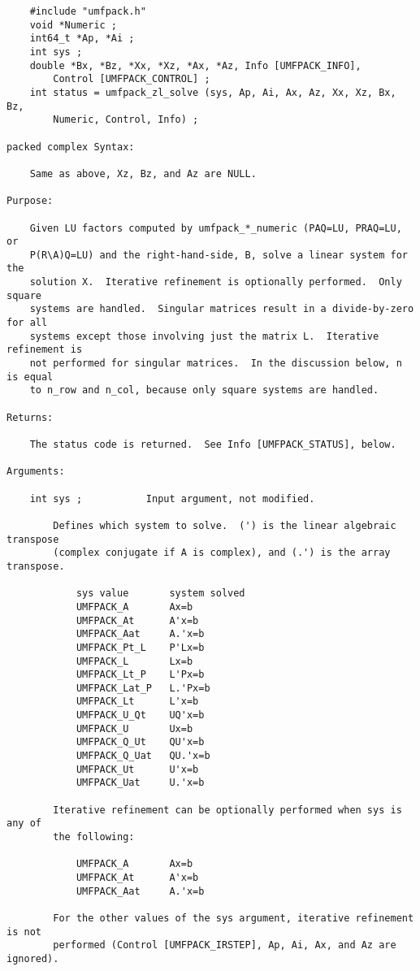 \documentclass[11pt]{article}
\begin{document}
{\begin{verbatim}
    #include "umfpack.h"
    void *Numeric ;
    int64_t *Ap, *Ai ;
    int sys ;
    double *Bx, *Bz, *Xx, *Xz, *Ax, *Az, Info [UMFPACK_INFO],
        Control [UMFPACK_CONTROL] ;
    int status = umfpack_zl_solve (sys, Ap, Ai, Ax, Az, Xx, Xz, Bx, Bz,
        Numeric, Control, Info) ;

packed complex Syntax:

    Same as above, Xz, Bz, and Az are NULL.

Purpose:

    Given LU factors computed by umfpack_*_numeric (PAQ=LU, PRAQ=LU, or
    P(R\A)Q=LU) and the right-hand-side, B, solve a linear system for the
    solution X.  Iterative refinement is optionally performed.  Only square
    systems are handled.  Singular matrices result in a divide-by-zero for all
    systems except those involving just the matrix L.  Iterative refinement is
    not performed for singular matrices.  In the discussion below, n is equal
    to n_row and n_col, because only square systems are handled.

Returns:

    The status code is returned.  See Info [UMFPACK_STATUS], below.

Arguments:

    int sys ;           Input argument, not modified.

        Defines which system to solve.  (') is the linear algebraic transpose
        (complex conjugate if A is complex), and (.') is the array transpose.

            sys value       system solved
            UMFPACK_A       Ax=b
            UMFPACK_At      A'x=b
            UMFPACK_Aat     A.'x=b
            UMFPACK_Pt_L    P'Lx=b
            UMFPACK_L       Lx=b
            UMFPACK_Lt_P    L'Px=b
            UMFPACK_Lat_P   L.'Px=b
            UMFPACK_Lt      L'x=b
            UMFPACK_U_Qt    UQ'x=b
            UMFPACK_U       Ux=b
            UMFPACK_Q_Ut    QU'x=b
            UMFPACK_Q_Uat   QU.'x=b
            UMFPACK_Ut      U'x=b
            UMFPACK_Uat     U.'x=b

        Iterative refinement can be optionally performed when sys is any of
        the following:

            UMFPACK_A       Ax=b
            UMFPACK_At      A'x=b
            UMFPACK_Aat     A.'x=b

        For the other values of the sys argument, iterative refinement is not
        performed (Control [UMFPACK_IRSTEP], Ap, Ai, Ax, and Az are ignored).


\end{verbatim}}
\end{document}
